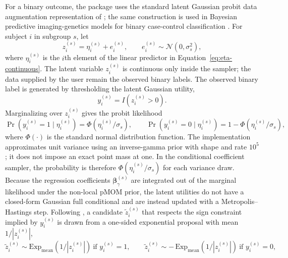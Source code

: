 \documentclass[article]{jss}
\begin{document}
For a binary outcome, the package uses the standard latent Gaussian probit
data augmentation representation of \citet{albert1993}; the same construction
is used in Bayesian predictive
imaging-genetics models for binary case-control classification
\citep{chekouo2016aoas}.  For subject $i$ in subgroup $s$, let
%
\begin{equation}\label{eq:binary-latent}
  z_i^{(s)} = \eta_i^{(s)} + e_i^{(s)}, \qquad
  e_i^{(s)} \sim \mathcal{N}(0,\sigma_s^2),
\end{equation}
%
where $\eta_i^{(s)}$ is the $i$th element of the linear predictor in
Equation~\ref{eq:eta-continuous}.  The latent variable
$z_i^{(s)}$ is continuous only inside the sampler; the data supplied by the user
remain the observed binary labels.  The observed binary label is generated by
thresholding the latent Gaussian utility,
%
\begin{equation}\label{eq:binary-threshold}
  y_i^{(s)} = I\!\left(z_i^{(s)} > 0\right).
\end{equation}
%
Marginalizing over $z_i^{(s)}$ gives the probit likelihood
%
\begin{equation}\label{eq:binary-probit}
  \Pr\!\left(y_i^{(s)}=1\mid\eta_i^{(s)}\right)
  = \Phi\!\left(\eta_i^{(s)}/\sigma_s\right), \qquad
  \Pr\!\left(y_i^{(s)}=0\mid\eta_i^{(s)}\right)
  = 1-\Phi\!\left(\eta_i^{(s)}/\sigma_s\right),
\end{equation}
%
where $\Phi(\cdot)$ is the standard normal distribution function. The
implementation approximates unit variance using an inverse-gamma prior with
shape and rate $10^5$; it does not impose an exact point mass at one. In the
conditional coefficient sampler, the probability is therefore
$\Phi(\eta_i^{(s)}/\sigma_s)$ for each variance draw. Because the
regression coefficients $\bm{\beta}_{\gamma}^{(s)}$ are integrated out of the
marginal likelihood under the non-local pMOM prior, the latent utilities do not
have a closed-form Gaussian full conditional and are instead updated with a
Metropolis--Hastings step.  Following \citet{chekouo2016aoas}, a candidate
$\tilde{z}_i^{(s)}$ that respects the sign constraint implied by $y_i^{(s)}$ is
drawn from a one-sided exponential proposal with mean $1/|z_i^{(s)}|$,
%
\begin{equation}\label{eq:binary-latent-update}
  \tilde{z}_i^{(s)} \sim \mathrm{Exp}_{\mathrm{mean}}\!\left(1/|z_i^{(s)}|\right)
  \ \text{if } y_i^{(s)}=1,
  \qquad
  \tilde{z}_i^{(s)} \sim -\,\mathrm{Exp}_{\mathrm{mean}}\!\left(1/|z_i^{(s)}|\right)
  \ \text{if } y_i^{(s)}=0,
\end{equation}
\end{document}
